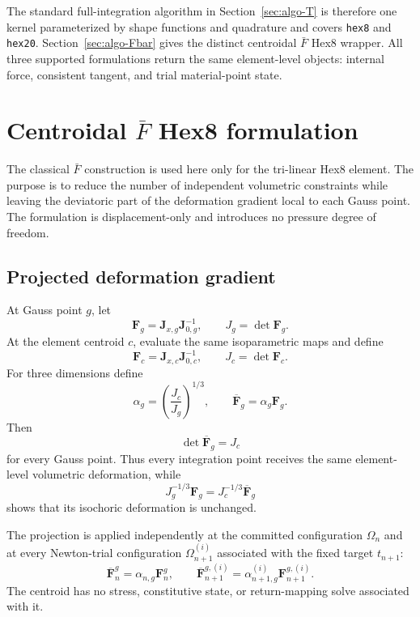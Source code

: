 \documentclass[11pt,a4paper]{article}
\newcommand{\bs}[1]{\boldsymbol{#1}}
\newcommand{\F}{\bs{F}}
\newcommand{\Fb}{\overline{\bs{F}}}
\newcommand{\vct}[1]{\mathbf{#1}}
\begin{document}
The standard full-integration algorithm in Section~\ref{sec:algo-T} is therefore one kernel parameterized by shape functions and quadrature and covers \texttt{hex8} and \texttt{hex20}. Section~\ref{sec:algo-Fbar} gives the distinct centroidal $\bar F$ Hex8 wrapper. All three supported formulations return the same element-level objects: internal force, consistent tangent, and trial material-point state.
\section{Centroidal \texorpdfstring{$\bar F$}{F-bar} Hex8 formulation}
\label{sec:fbar-hex8}

The classical $\bar F$ construction is used here only for the tri-linear Hex8 element. The purpose is to reduce the number of independent volumetric constraints while leaving the deviatoric part of the deformation gradient local to each Gauss point. The formulation is displacement-only and introduces no pressure degree of freedom.

\subsection{Projected deformation gradient}

At Gauss point $g$, let
\begin{equation}
\F_g=\vct J_{x,g}\vct J_{0,g}^{-1},
\qquad
J_g=\det\F_g.
\end{equation}
At the element centroid $c$, evaluate the same isoparametric maps and define
\begin{equation}
\F_c=\vct J_{x,c}\vct J_{0,c}^{-1},
\qquad
J_c=\det\F_c.
\end{equation}
For three dimensions define
\begin{equation}
\boxed{
\alpha_g=\left(\frac{J_c}{J_g}\right)^{1/3},
\qquad
\Fb_g=\alpha_g\F_g.
}
\label{eq:fbar-def}
\end{equation}
Then
\begin{equation}
\det\Fb_g=J_c
\end{equation}
for every Gauss point. Thus every integration point receives the same element-level volumetric deformation, while
\begin{equation}
J_g^{-1/3}\F_g
=
J_c^{-1/3}\Fb_g
\end{equation}
shows that its isochoric deformation is unchanged.

The projection is applied independently at the committed configuration $\Omega_n$ and at every Newton-trial configuration $\Omega_{n+1}^{(i)}$ associated with the fixed target $t_{n+1}$:
\begin{equation}
\Fb_n^g=\alpha_{n,g}\F_n^g,
\qquad
\Fb_{n+1}^{g,(i)}=\alpha_{n+1,g}^{(i)}\F_{n+1}^{g,(i)}.
\label{eq:fbar-two-endpoints}
\end{equation}
The centroid has no stress, constitutive state, or return-mapping solve associated with it.
\end{document}

